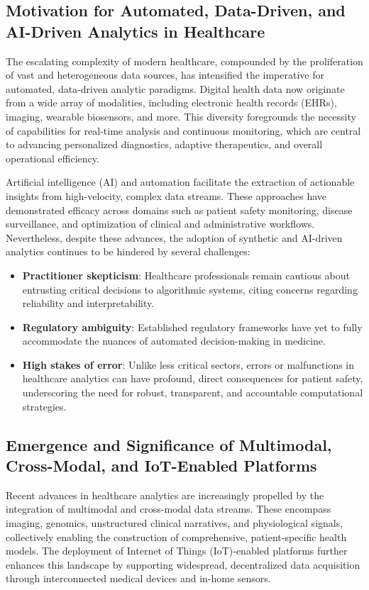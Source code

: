 \documentclass[11pt]{article}
\begin{document}
\subsection{Motivation for Automated, Data-Driven, and AI-Driven Analytics in Healthcare}

The escalating complexity of modern healthcare, compounded by the proliferation of vast and heterogeneous data sources, has intensified the imperative for automated, data-driven analytic paradigms. Digital health data now originate from a wide array of modalities, including electronic health records (EHRs), imaging, wearable biosensors, and more. This diversity foregrounds the necessity of capabilities for real-time analysis and continuous monitoring, which are central to advancing personalized diagnostics, adaptive therapeutics, and overall operational efficiency.

Artificial intelligence (AI) and automation facilitate the extraction of actionable insights from high-velocity, complex data streams. These approaches have demonstrated efficacy across domains such as patient safety monitoring, disease surveillance, and optimization of clinical and administrative workflows. Nevertheless, despite these advances, the adoption of synthetic and AI-driven analytics continues to be hindered by several challenges:

\begin{itemize}
    \item \textbf{Practitioner skepticism}: Healthcare professionals remain cautious about entrusting critical decisions to algorithmic systems, citing concerns regarding reliability and interpretability.
    \item \textbf{Regulatory ambiguity}: Established regulatory frameworks have yet to fully accommodate the nuances of automated decision-making in medicine.
    \item \textbf{High stakes of error}: Unlike less critical sectors, errors or malfunctions in healthcare analytics can have profound, direct consequences for patient safety, underscoring the need for robust, transparent, and accountable computational strategies.
\end{itemize}

\subsection{Emergence and Significance of Multimodal, Cross-Modal, and IoT-Enabled Platforms}

Recent advances in healthcare analytics are increasingly propelled by the integration of multimodal and cross-modal data streams. These encompass imaging, genomics, unstructured clinical narratives, and physiological signals, collectively enabling the construction of comprehensive, patient-specific health models. The deployment of Internet of Things (IoT)-enabled platforms further enhances this landscape by supporting widespread, decentralized data acquisition through interconnected medical devices and in-home sensors.
\end{document}

